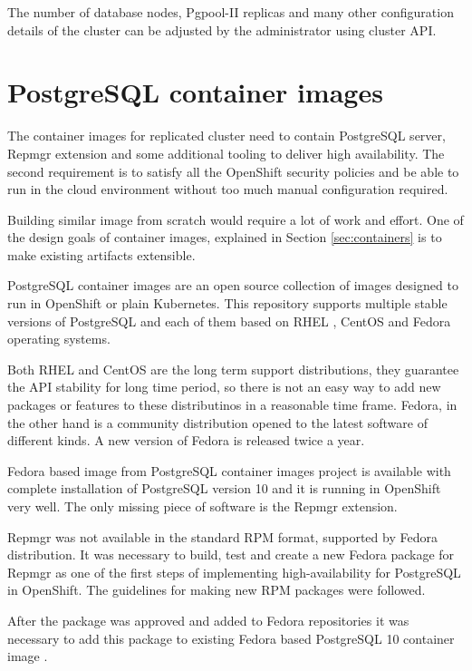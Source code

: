 \documentclass[
  digital, %
  twoside, %
  table,   %
  lof,     %
  lot,     %
]{fithesis3}
\begin{document}
The number of database nodes, Pgpool-II replicas and many other configuration details of the cluster can be adjusted by the administrator using cluster API.

\section{PostgreSQL container images} \label{sec:pg_cnt_images}
The container images for replicated cluster need to contain PostgreSQL server, Repmgr extension and some additional tooling to deliver high availability. The second requirement is to satisfy all the OpenShift security policies and be able to run in the cloud environment without too much manual configuration required.

Building similar image from scratch would require a lot of work and effort. One of the design goals of container images, explained in Section \ref{sec:containers} is to make existing artifacts extensible.

PostgreSQL container images \cite{pg_cnt} are an open source collection of images designed to run in OpenShift or plain Kubernetes. This repository supports multiple stable versions of PostgreSQL and each of them based on RHEL \cite{rhel}, CentOS \cite{centos} and Fedora \cite{getfedora} operating systems.

Both RHEL and CentOS are the long term support distributions, they guarantee the API stability for long time period, so there is not an easy way to add new packages or features to these distributinos in a reasonable time frame. Fedora, in the other hand is a community distribution opened to the latest software of different kinds. A new version of Fedora is released twice a year.

Fedora based image from PostgreSQL container images project is available with complete installation of PostgreSQL version 10 and it is running in OpenShift very well. The only missing piece of software is the Repmgr extension.

Repmgr was not available in the standard RPM \cite{rpm} format, supported by Fedora distribution. It was necessary to build, test and create a new Fedora package for Repmgr \cite{fedora_repmgr} as one of the first steps of implementing high-availability for PostgreSQL in OpenShift. The guidelines for making new RPM packages \cite{fedora_new_package} were followed.

After the package was approved and added to Fedora repositories \cite{fedora_repositories} it was necessary to add this package to existing Fedora based PostgreSQL 10 container image \cite{pg_img}.
\end{document}
